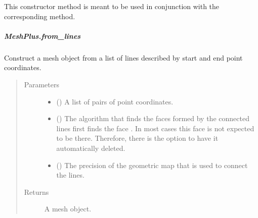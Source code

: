 \documentclass[letterpaper,10pt,english]{sphinxmanual}
\begin{document}
\begin{fulllineitems}
\begin{fulllineitems}
This constructor method is meant to be used in conjunction with the
corresponding  method.

\end{fulllineitems}



\subparagraph{MeshPlus.from\_lines}
\label{\detokenize{api/generated/directional_clustering.mesh.MeshPlus.from_lines:meshplus-from-lines}}\label{\detokenize{api/generated/directional_clustering.mesh.MeshPlus.from_lines::doc}}

\begin{fulllineitems}
\label{\detokenize{api/generated/directional_clustering.mesh.MeshPlus.from_lines:directional_clustering.mesh.MeshPlus.from_lines}}
Construct a mesh object from a list of lines described by start and end point coordinates.
\begin{quote}\begin{description}
\item[{Parameters}] \leavevmode\begin{itemize}
\item {} 
 () \textendash{} A list of pairs of point coordinates.

\item {} 
 () \textendash{} The algorithm that finds the faces formed by the connected lines
first finds the face . In most cases this face is not expected
to be there. Therefore, there is the option to have it automatically deleted.

\item {} 
 () \textendash{} The precision of the geometric map that is used to connect the lines.

\end{itemize}

\item[{Returns}] \leavevmode
{} \textendash{} A mesh object.


\end{description}
\end{quote}
\end{fulllineitems}
\end{fulllineitems}
\end{document}

